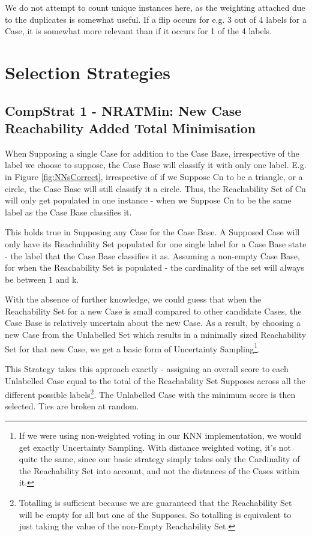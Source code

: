 \documentclass[a4paper,11pt]{report}
\begin{document}
We do not attempt to count unique instances here, as the weighting attached due to the duplicates is somewhat useful. If a flip occurs for e.g. 3 out of 4 labels for a Case, it is somewhat more relevant than if it occurs for 1 of the 4 labels.

\section{Selection Strategies}
\subsection{CompStrat 1 - NRATMin: New Case Reachability Added Total Minimisation\label{sec:compstrat1}}
When Supposing a single Case for addition to the Case Base, irrespective of the label we choose to suppose, the Case Base will classify it with only one label. E.g. in Figure \ref{fig:NNsCorrect}, irrespective of if we Suppose Cn to be a triangle, or a circle, the Case Base will still classify it a circle. Thus, the Reachability Set of Cn will only get populated in one instance - when we Suppose Cn to be the same label as the Case Base classifies it.

This holds true in Supposing any Case for the Case Base. A Supposed Case will only have its Reachability Set populated for one single label for a Case Base state - the label that the Case Base classifies it as. Assuming a non-empty Case Base, for when the Reachability Set is populated - the cardinality of the set will always be between 1 and k.

With the absence of further knowledge, we could guess that when the Reachability Set for a new Case is small compared to other candidate Cases, the Case Base is relatively uncertain about the new Case. As a result, by choosing a new Case from the Unlabelled Set which results in a minimally sized Reachability Set for that new Case, we get a basic form of Uncertainty Sampling\footnote{If we were using non-weighted voting in our KNN implementation, we would get exactly Uncertainty Sampling. With distance weighted voting, it's not quite the same, since our basic strategy simply takes only the Cardinality of the Reachability Set into account, and not the distances of the Cases within it.}.

This Strategy takes this approach exactly - assigning an overall score to each Unlabelled Case equal to the total of the Reachability Set Supposes across all the different possible labels\footnote{Totalling is sufficient because we are guaranteed that the Reachability Set will be empty for all but one of the Supposes. So totalling is equivalent to just taking the value of the non-Empty Reachability Set.}. The Unlabelled Case with the minimum score is then selected. Ties are broken at random.
\end{document}
